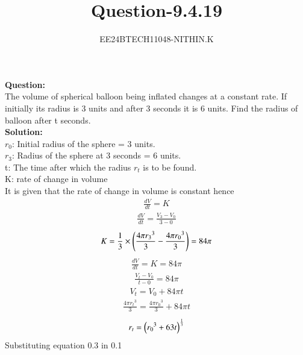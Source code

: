 \documentclass[journal]{IEEEtran}
\numberwithin{equation}{enumi}
\numberwithin{figure}{enumi}
\begin{document}


\title{Question-9.4.19}
\author{EE24BTECH11048-NITHIN.K} 
{\let\newpage\relax\maketitle}
\textbf{Question:} \\
  The volume of spherical balloon being inflated changes at a constant rate. If initially its radius is 3 units and after 3 seconds it is 6 units. Find the radius of balloon after t seconds. \\ 

\textbf{Solution:} \\
$r_0$: Initial radius of the sphere = 3 units. \\
$r_3$: Radius of the sphere at 3 seconds = 6 units. \\
t: The time after which the radius $r_t$ is to be found. \\
K: rate of change in volume \\
  It is given that the rate of change in volume is constant hence \\
  \begin{align}
	  \frac{dV}{dt} = K
  \end{align}
  \begin{align}
	  \frac{dV}{dt} = \frac{V_3 - V_0}{3-0}
  \end{align}
  \begin{align}
	  K = \frac{1}{3} \times \left(\frac{4\pi {r_3}^3}{3} - \frac{4\pi {r_0}^3}{3}\right) = 84\pi
  \end{align}
  \begin{align}
	  \frac{dV}{dt} = K = 84\pi
  \end{align}
  \begin{align}
	  \frac{V_t - V_0}{t-0} = 84\pi
  \end{align}
  \begin{align}
	  V_t = V_0 + 84\pi t
  \end{align}
  \begin{align}
	  \frac{4\pi {r_t}^3}{3} = \frac{4\pi {r_0}^3}{3} + 84\pi t
  \end{align}
  \begin{align}
	  r_t = \left({r_0}^3 + 63t\right)^{\frac{1}{3}}
  \end{align}
Substituting equation 0.3 in 0.1
\end{document}
